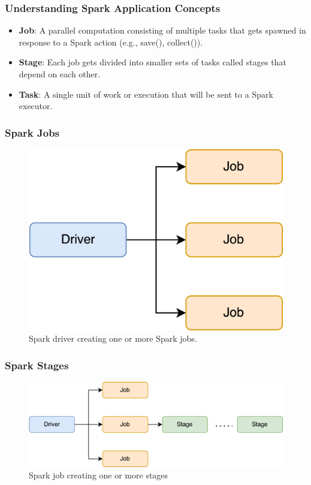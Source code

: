 \begin{frame}
    \frametitle{Understanding Spark Application Concepts}
    \begin{itemize}
        \item \textbf{Job}: A parallel computation consisting of multiple tasks that gets spawned in response
        to a Spark action (e.g., save(), collect()).
        \item \textbf{Stage}: Each job gets divided into smaller sets of tasks called stages that depend on each
        other.
        \item \textbf{Task}: A single unit of work or execution that will be sent to a Spark executor.
    \end{itemize}
\end{frame}
\begin{frame}
    \frametitle{Spark Jobs}
    \begin{figure}
        \includegraphics[width=\textwidth,height=.7\textheight,keepaspectratio]{./Figures/chapter-04/spark_job}
        \caption{Spark driver creating one or more Spark jobs.}\label{fig:spark_job}
    \end{figure}
\end{frame}
\begin{frame}
    \frametitle{Spark Stages}
    \begin{figure}
        \includegraphics[width=\textwidth,height=.65\textheight,keepaspectratio]{./Figures/chapter-04/Spark_Stages}
        \caption{Spark job creating one or more stages}\label{fig:spark_stages}
    \end{figure}
\end{frame}
